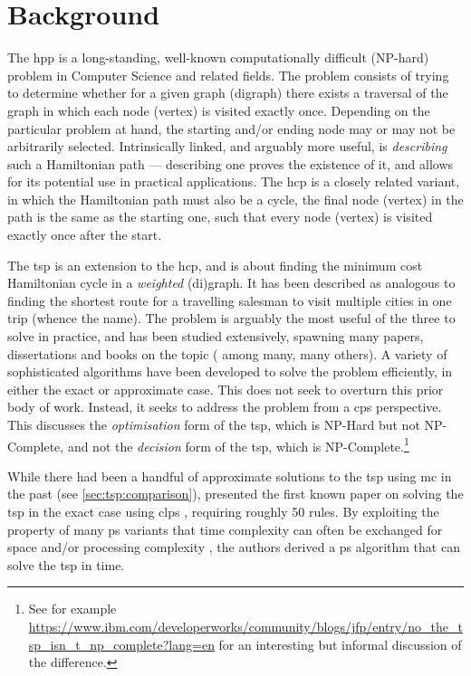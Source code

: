 \section{Background}

The \gls{hpp} is a long-standing, well-known computationally difficult (NP-hard) problem in Computer Science and related fields.  The problem consists of trying to determine whether for a given graph (digraph) there exists a traversal of the graph in which each node (vertex) is visited exactly once.  Depending on the particular problem at hand, the starting and/or ending node may or may not be arbitrarily selected.  Intrinsically linked, and arguably more useful, is \emph{describing} such a Hamiltonian path --- describing one proves the existence of it, and allows for its potential use in practical applications.  The \gls{hcp} is a closely related variant, in which the Hamiltonian path must also be a cycle, \ie{} the final node (vertex) in the path is the same as the starting one, such that every node (vertex) is visited exactly once after the start.

The \gls{tsp} is an extension to the \gls{hcp}, and is about finding the minimum cost Hamiltonian cycle in a \emph{weighted} (di)graph.  It has been described as analogous to finding the shortest route for a travelling salesman to visit multiple cities in one trip (whence the name).  The problem is arguably the most useful of the three to solve in practice, and has been studied extensively, spawning many papers, dissertations and books on the topic (\eg{} \cite{Smith2017,Ezugwu2017,Cook2012,Applegate2006} among many, many others).  A variety of sophisticated algorithms have been developed to solve the problem efficiently, in either the exact or approximate case.  This  does not seek to overturn this prior body of work.  Instead, it seeks to address the problem from a \gls{cps} perspective.  This  discusses the \emph{optimisation} form of the \gls{tsp}, which is NP-Hard but not NP-Complete, and not the \emph{decision} form of the \gls{tsp}, which is NP-Complete.\footnote{See for example \url{https://www.ibm.com/developerworks/community/blogs/jfp/entry/no_the_tsp_isn_t_np_complete?lang=en} for an interesting but informal discussion of the difference.}

While there had been a handful of approximate solutions to the \gls{tsp} using \gls{mc} in the past (see \vref{sec:tsp:comparison}), \citeauthor{Guo2017} presented the first known paper on solving the \gls{tsp} in the exact case using \gls{clps} \cite{Guo2017}, requiring roughly 50 rules.  By exploiting the property of many \gls{ps} variants that time complexity can often be exchanged for space and/or processing complexity \cite{Paun1999,Paun2002a,Jimenez2003,Song2017}, the authors derived a \gls{ps} algorithm that can solve the \gls{tsp} in  time.

